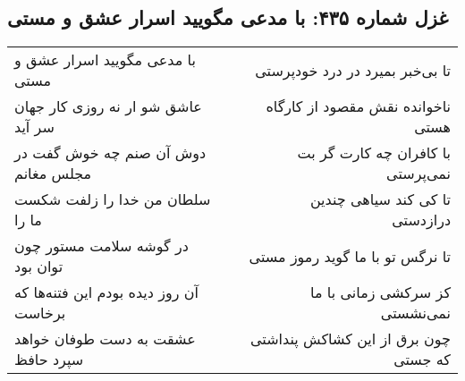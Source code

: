 \begin{center}
\section*{غزل شماره ۴۳۵: با مدعی مگویید اسرار عشق و مستی}
\label{sec:sh435}
\begin{longtable}{l p{0.5cm} r}
با مدعی مگویید اسرار عشق و مستی
&&
تا بی‌خبر بمیرد در درد خودپرستی
\\
عاشق شو ار نه روزی کار جهان سر آید
&&
ناخوانده نقش مقصود از کارگاه هستی
\\
دوش آن صنم چه خوش گفت در مجلس مغانم
&&
با کافران چه کارت گر بت نمی‌پرستی
\\
سلطان من خدا را زلفت شکست ما را
&&
تا کی کند سیاهی چندین درازدستی
\\
در گوشه سلامت مستور چون توان بود
&&
تا نرگس تو با ما گوید رموز مستی
\\
آن روز دیده بودم این فتنه‌ها که برخاست
&&
کز سرکشی زمانی با ما نمی‌نشستی
\\
عشقت به دست طوفان خواهد سپرد حافظ
&&
چون برق از این کشاکش پنداشتی که جستی
\\
\end{longtable}
\end{center}
